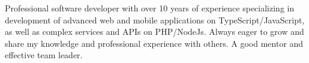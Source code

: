 


\begin{cvparagraph}

Professional software developer with over 10 years of experience specializing in development of advanced web and mobile applications on TypeScript/JavaScript, as well as complex services and APIs on PHP/NodeJs.
Always eager to grow and share my knowledge and professional experience with others. A good mentor and effective team leader.
\end{cvparagraph}
\vspace{-2mm}
